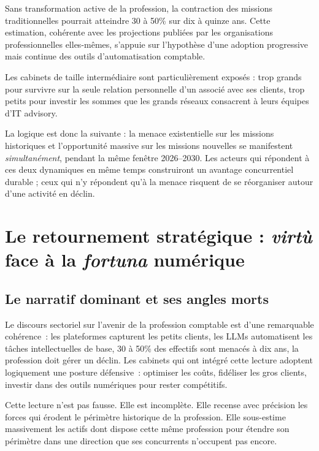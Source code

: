 \documentclass[12pt,a4paper]{article}
\begin{document}
Sans transformation active de la profession, la contraction des missions traditionnelles pourrait atteindre 30 à 50\% sur dix à quinze ans. Cette estimation, cohérente avec les projections publiées par les organisations professionnelles elles-mêmes, s'appuie sur l'hypothèse d'une adoption progressive mais continue des outils d'automatisation comptable.

Les cabinets de taille intermédiaire sont particulièrement exposés : trop grands pour survivre sur la seule relation personnelle d'un associé avec ses clients, trop petits pour investir les sommes que les grands réseaux consacrent à leurs équipes d'IT advisory.

La logique est donc la suivante : la menace existentielle sur les missions historiques et l'opportunité massive sur les missions nouvelles se manifestent \emph{simultanément}, pendant la même fenêtre 2026--2030. Les acteurs qui répondent à ces deux dynamiques en même temps construiront un avantage concurrentiel durable ; ceux qui n'y répondent qu'à la menace risquent de se réorganiser autour d'une activité en déclin.

\section{Le retournement stratégique : \emph{virtù} face à la \emph{fortuna} numérique}

\subsection{Le narratif dominant et ses angles morts}

Le discours sectoriel sur l'avenir de la profession comptable est d'une remarquable cohérence~: les plateformes capturent les petits clients, les LLMs automatisent les tâches intellectuelles de base, 30 à 50\% des effectifs sont menacés à dix ans, la profession doit gérer un déclin. Les cabinets qui ont intégré cette lecture adoptent logiquement une posture défensive~: optimiser les coûts, fidéliser les gros clients, investir dans des outils numériques pour rester compétitifs.

Cette lecture n'est pas fausse. Elle est incomplète. Elle recense avec précision les forces qui érodent le périmètre historique de la profession. Elle sous-estime massivement les actifs dont dispose cette même profession pour étendre son périmètre dans une direction que ses concurrents n'occupent pas encore.
\end{document}
